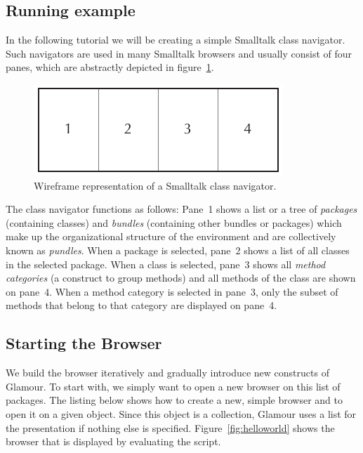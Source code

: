 \documentclass[a4paper,10pt,twoside]{book}
\begin{document}
\subsection{Running example}
\label{sec:tutorial/getting_started}

In the following tutorial we will be creating a simple Smalltalk class navigator. Such navigators are used in many Smalltalk browsers and usually consist of four panes, which are abstractly depicted in figure~\ref{fig:classnavigator_wireframe}.

\begin{figure}[htbp]
\centerline{\includegraphics[width=\linewidth]{classnavigator_wireframe.pdf}}
\caption{Wireframe representation of a Smalltalk class navigator.}
\label{fig:classnavigator_wireframe}
\end{figure}

The class navigator functions as follows: Pane~1 shows a list or a tree of \emph{packages} (containing classes) and \emph{bundles} (containing other bundles or packages) which make up the organizational structure of the environment and are collectively known as \emph{pundles}. When a package is selected, pane~2 shows a list of all classes in the selected package. When a class is selected, pane~3 shows all \emph{method categories} (a construct to group methods) and all methods of the class are shown on pane~4. When a method category is selected in pane~3, only the subset of methods that belong to that category are displayed on pane~4.


\subsection{Starting the Browser}

We build the browser iteratively and gradually introduce new constructs of Glamour. To start with, we simply want to open a new browser on this list of packages. The listing below shows how to create a new, simple browser and to open it on a given object. Since this object is a collection, Glamour uses a list for the presentation if nothing else is specified. Figure~\ref{fig:helloworld} shows the browser that is displayed by evaluating the script.
\end{document}

